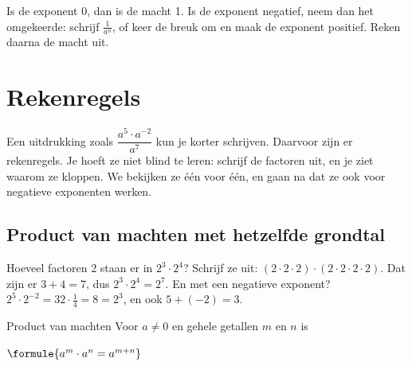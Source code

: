 
\begin{werkwijze}
Is de exponent 0, dan is de macht 1. Is de exponent negatief, neem dan het omgekeerde: schrijf $\tfrac{1}{a^n}$, of keer de breuk om en maak de exponent positief. Reken daarna de macht uit.
\end{werkwijze}

\begin{oefeningen}
\end{oefeningen}

\section{Rekenregels}

Een uitdrukking zoals $\dfrac{a^5 \cdot a^{-2}}{a^7}$ kun je korter schrijven. Daarvoor zijn er rekenregels. Je hoeft ze niet blind te leren: schrijf de factoren uit, en je ziet waarom ze kloppen. We bekijken ze één voor één, en gaan na dat ze ook voor negatieve exponenten werken.

\subsection{Product van machten met hetzelfde grondtal}

Hoeveel factoren 2 staan er in $2^3 \cdot 2^4$? Schrijf ze uit: $(2 \cdot 2 \cdot 2) \cdot (2 \cdot 2 \cdot 2 \cdot 2)$. Dat zijn er $3 + 4 = 7$, dus $2^3 \cdot 2^4 = 2^7$. En met een negatieve exponent? $2^5 \cdot 2^{-2} = 32 \cdot \tfrac14 = 8 = 2^3$, en ook $5 + (-2) = 3$.

\begin{theorie}
\begin{stelling}{Product van machten}
Voor $a \neq 0$ en gehele getallen $m$ en $n$ is

\vspace{1mm}
\qquad $\formule{a^m \cdot a^n = a^{m+n}}$
\end{stelling}
\end{theorie}

